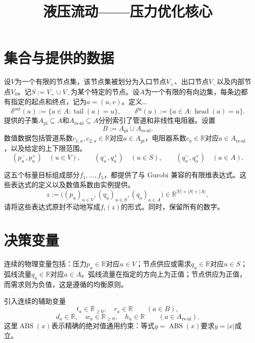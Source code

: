 \documentclass[11pt]{article}
\title{液压流动——压力优化核心}
\author{}
\date{}
\begin{document}
\maketitle

\section{集合与提供的数据}
设$V$为一个有限的节点集，该节点集被划分为入口节点$V_+$、出口节点$V_-$以及内部节点$V_0$。记$S:=V_+\cup V_-$为某个特定的节点。设$A$为一个有限的有向边集，每条边都有指定的起点和终点，记为$a=(u,v)$。定义…
\[
\delta^{\mathrm{out}}(u):=\{a\in A:\operatorname{tail}(a)=u\},
\qquad
\delta^{\mathrm{in}}(u):=\{a\in A:\operatorname{head}(a)=u\}.
\]
提供的子集$A_{\mathrm{pi}}\subseteq A$和$A_{\mathrm{rs\text{-}nl}}\subseteq A$分别索引了管道和非线性电阻器。设置
\[
B:=A_{\mathrm{pi}}\cup A_{\mathrm{rs\text{-}nl}}.
\]
数值数据包括管道系数$c_{1,a},c_{2,a}\in\mathbb R$对应$a\in A_{\mathrm{pi}}$，电阻器系数$c_a\in\mathbb R$对应$a\in A_{\mathrm{rs\text{-}nl}}$，以及给定的上下限范围。
\[
(p_u^-,p_u^+)\quad(u\in V),\qquad
(q_u^-,q_u^+)\quad(u\in S),\qquad
(q_a^-,q_a^+)\quad(a\in A).
\]


这五个标量目标组成部分$f_1,\ldots,f_5$，都提供了与 Gurobi 兼容的有限维表达式。这些表达式的定义以及数值系数由实例提供。
\[
z:=\bigl((p_u)_{u\in V},(q_u)_{u\in S},(q_a)_{a\in A}\bigr)
\in\mathbb R^{|V|+|S|+|A|},
\]
请将这些表达式原封不动地写成$f_i(z)$的形式。同时，保留所有的数字。 

\section{决策变量}
连续的物理变量包括：压力$p_u\in\mathbb R$对应$u\in V$；节点供应或需求$q_u\in\mathbb R$对应$u\in S$；弧线流量$q_a\in\mathbb R$对应$a\in A$。弧线流量在指定的方向上为正值；节点供应为正值，而需求则为负值，这是遵循的均衡原则。

引入连续的辅助变量
\[
t_a\in\mathbb R_{\geq0},\quad r_a\in\mathbb R
\qquad(a\in B),
\]
\[
d_a\in\mathbb R,\quad w_a\in\mathbb R_{\geq0},\quad h_a\in\mathbb R
\qquad(a\in A_{\mathrm{rs\text{-}nl}}).
\]
这里$\operatorname{ABS}(x)$表示精确的绝对值通用约束：等式$y=\operatorname{ABS}(x)$要求$y=|x|$成立。
\end{document}
